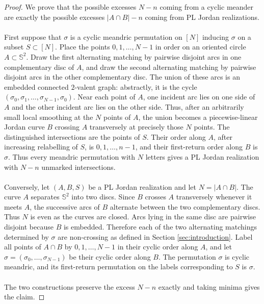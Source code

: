 \documentclass[11pt,a4paper]{amsart}
\theoremstyle{definition}
\theoremstyle{remark}
\begin{document}
\begin{proof}
We prove that the possible excesses $N-n$ coming from a cyclic meander are exactly the possible excesses $|A\cap B|-n$ coming from
PL Jordan realizations.
\\
\\
First suppose that $\sigma$ is a cyclic meandric permutation on $[N]$ inducing
$\sigma$ on a subset $S\subset [N]$.  Place the points $0,1,\ldots,N-1$ in order on an oriented circle $A\subset \mathbb{S}^2$.  Draw the first alternating matching by pairwise disjoint arcs in one complementary disc of $A$, and draw the second alternating matching by pairwise disjoint arcs in the other complementary disc.  The union of these arcs is an embedded connected  $2$-valent  graph: abstractly, it is the cycle $(\sigma_0,\sigma_1,\ldots,\sigma_{N-1},\sigma_0)$. Near each point of $A$, one incident arc lies on one side of $A$ and the other incident arc lies on the other side.  Thus, after an arbitrarily small local smoothing at the $N$ points of $A$, the union becomes a piecewise-linear Jordan curve $B$ crossing $A$ transversely at precisely those $N$ points.  The distinguished intersections are the points of $S$.  Their order along $A$, after increasing relabelling of $S$, is $0,1,\ldots,n-1$, and their first-return order along $B$ is $\sigma$. Thus every meandric permutation with $N$ letters gives a PL Jordan realization with $N-n$ unmarked intersections.
\\
\\
Conversely, let $(A,B,S)$ be a PL Jordan realization and let $N=|A\cap B|$. The curve $A$ separates $\mathbb{S}^2$ into two discs.  Since $B$ crosses $A$ transversely whenever it meets $A$, the successive arcs of $B$ alternate between the two complementary discs.  Thus $N$ is even as the curves are closed.  Arcs lying in the same disc are pairwise disjoint because $B$ is embedded.  Therefore each of the two alternating matchings determined by $\sigma$ are non-crossing as defined in Section \ref{sec:introduction}. Label all points of $A\cap B$ by $0,1,\ldots,N-1$ in their cyclic order along $A$, and let $\sigma=(\sigma_0,\ldots,\sigma_{N-1})$ be their cyclic order along $B$. The permutation $\sigma$ is cyclic meandric, and its first-return permutation on the labels corresponding to $S$ is $\sigma$.
\\
\\
The two constructions preserve the excess $N-n$ exactly and taking minima gives the
claim.
\end{proof}
\end{document}
